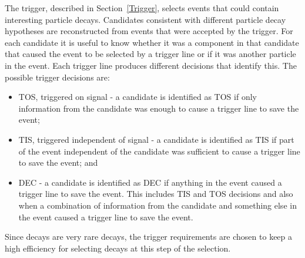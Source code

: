 The trigger, described in Section~\ref{Trigger}, selects events that could contain interesting particle decays. Candidates consistent with different particle decay hypotheses are reconstructed from events that were accepted by the trigger.
For each candidate it is useful to know whether it was a component in that candidate that caused the event to be selected by a trigger line or if it was another particle in the event. 
Each trigger line produces different decisions that identify this. 
The possible trigger decisions are: %
\begin{itemize}
\item TOS, triggered on signal - a candidate is identified as TOS if only information from the candidate was enough to cause a trigger line to save the event;
\item TIS, triggered independent of signal - a candidate is identified as TIS if part of the event independent of the candidate was sufficient to cause a trigger line to save the event; and
\item DEC - a candidate is identified as DEC if anything in the event caused a trigger line to save the event. This includes TIS and TOS decisions and also when a combination of information from the candidate and something else in the event caused a trigger line to save the event.
\end{itemize}
Since \bmumu decays are very rare decays, the trigger requirements are chosen to keep a high efficiency for selecting \bmumu decays at this step of the selection. 
